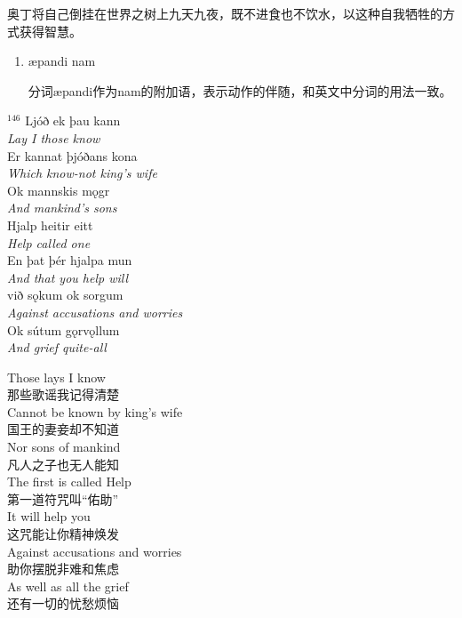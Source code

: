 \begin{grammar*}{}
    奥丁将自己倒挂在世界之树上九天九夜，既不进食也不饮水，以这种自我牺牲的方式获得智慧。
    \begin{enumerate}[leftmargin=*]

        \item æpandi nam

              分词æpandi作为nam的附加语，表示动作的伴随，和英文中分词的用法一致。

    \end{enumerate}
\end{grammar*}
\medskip %
\begin{paracol}{2}
    \noindent
    $^{146}$ Ljóð ek þau kann\\
    \textit{Lay I those know}\\
    Er kannat þjóðans kona\\
    \textit{Which know-not king's wife}\\
    Ok mannskis mǫgr\\
    \textit{And mankind's sons}\\
    Hjalp heitir eitt\\
    \textit{Help called one}\\
    En þat þér hjalpa mun\\
    \textit{And that you help will}\\
    við sǫkum ok sorgum\\
    \textit{Against accusations and worries}\\
    Ok sútum gǫrvǫllum\\
    \textit{And grief quite-all}\\
    \switchcolumn

    \noindent
    Those lays I know\\
    那些歌谣我记得清楚\\
    Cannot be known by king's wife\\
    国王的妻妾却不知道\\
    Nor sons of mankind\\
    凡人之子也无人能知\\
    The first is called Help\\
    第一道符咒叫“佑助”\\
    It will help you\\
    这咒能让你精神焕发\\
    Against accusations and worries\\
    助你摆脱非难和焦虑\\
    As well as all the grief\\
    还有一切的忧愁烦恼\\
\end{paracol}

